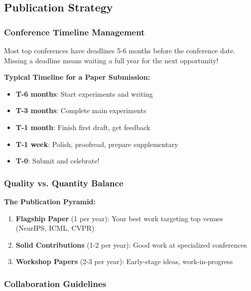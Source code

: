 \documentclass[11pt,a4paper]{article}
\begin{document}
\subsection{Publication Strategy}

\subsubsection{Conference Timeline Management}

\begin{tcolorbox}[colback=red!10,colframe=red!50,title=Critical: Plan Your Submissions 6 Months Ahead]
Most top conferences have deadlines 5-6 months before the conference date. Missing a deadline means waiting a full year for the next opportunity!

\textbf{Typical Timeline for a Paper Submission:}
\begin{itemize}
    \item \textbf{T-6 months}: Start experiments and writing
    \item \textbf{T-3 months}: Complete main experiments
    \item \textbf{T-1 month}: Finish first draft, get feedback
    \item \textbf{T-1 week}: Polish, proofread, prepare supplementary
    \item \textbf{T-0}: Submit and celebrate!
\end{itemize}
\end{tcolorbox}

\subsubsection{Quality vs. Quantity Balance}

\textbf{The Publication Pyramid:}
\begin{enumerate}
    \item \textbf{Flagship Paper} (1 per year): Your best work targeting top venues (NeurIPS, ICML, CVPR)
    \item \textbf{Solid Contributions} (1-2 per year): Good work at specialized conferences
    \item \textbf{Workshop Papers} (2-3 per year): Early-stage ideas, work-in-progress
\end{enumerate}

\subsubsection{Collaboration Guidelines}
\end{document}
